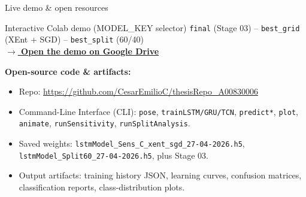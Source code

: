 \begin{frame}{Live demo \& open resources}
\hypertarget{sub:demo}{}%
\begin{exampleblock}{Interactive Colab demo (MODEL\_KEY selector)}
\small \texttt{final} (Stage 03) -- \texttt{best\_grid} (XEnt + SGD) -- \texttt{best\_split} (60/40)\\[2pt]
\href{https://drive.google.com/file/d/1ilXqfHP970POqXvRvfTO6ZWcD54KAfLP/view?usp=drive_link}{\color{tecaccent}\textbf{$\rightarrow$ Open the demo on Google Drive}}
\end{exampleblock}
\vspace{6pt}
\textbf{\color{tecdark}Open-source code \& artifacts:}
\begin{itemize}\small
    \item Repo: \url{https://github.com/CesarEmilioC/thesisRepo_A00830006}
    \item Command-Line Interface (CLI): \texttt{pose}, \texttt{trainLSTM/GRU/TCN}, \texttt{predict*}, \texttt{plot}, \texttt{animate}, \texttt{runSensitivity}, \texttt{runSplitAnalysis}.
    \item Saved weights: \texttt{lstmModel\_Sens\_C\_xent\_sgd\_27-04-2026.h5}, \texttt{lstmModel\_Split60\_27-04-2026.h5}, plus Stage 03.
    \item Output artifacts: training history JSON, learning curves, confusion matrices, classification reports, class-distribution plots.
\end{itemize}
\end{frame}
